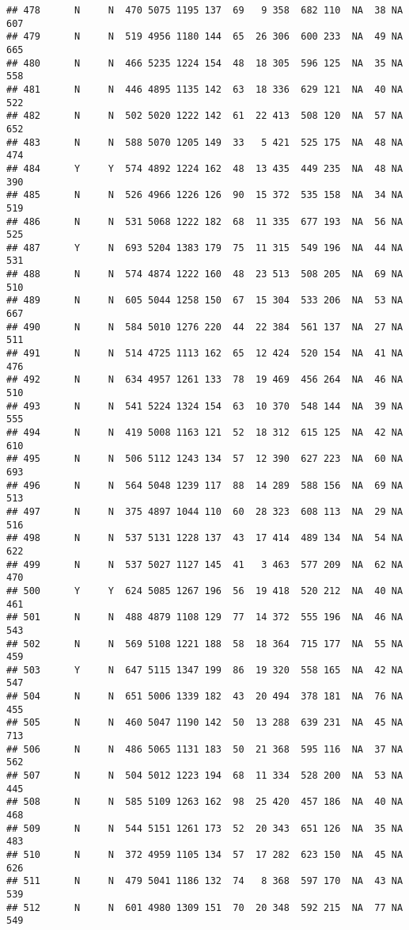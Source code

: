 \documentclass[]{article}
\begin{document}
\begin{verbatim}
## 478      N     N  470 5075 1195 137  69   9 358  682 110  NA  38 NA  607
## 479      N     N  519 4956 1180 144  65  26 306  600 233  NA  49 NA  665
## 480      N     N  466 5235 1224 154  48  18 305  596 125  NA  35 NA  558
## 481      N     N  446 4895 1135 142  63  18 336  629 121  NA  40 NA  522
## 482      N     N  502 5020 1222 142  61  22 413  508 120  NA  57 NA  652
## 483      N     N  588 5070 1205 149  33   5 421  525 175  NA  48 NA  474
## 484      Y     Y  574 4892 1224 162  48  13 435  449 235  NA  48 NA  390
## 485      N     N  526 4966 1226 126  90  15 372  535 158  NA  34 NA  519
## 486      N     N  531 5068 1222 182  68  11 335  677 193  NA  56 NA  525
## 487      Y     N  693 5204 1383 179  75  11 315  549 196  NA  44 NA  531
## 488      N     N  574 4874 1222 160  48  23 513  508 205  NA  69 NA  510
## 489      N     N  605 5044 1258 150  67  15 304  533 206  NA  53 NA  667
## 490      N     N  584 5010 1276 220  44  22 384  561 137  NA  27 NA  511
## 491      N     N  514 4725 1113 162  65  12 424  520 154  NA  41 NA  476
## 492      N     N  634 4957 1261 133  78  19 469  456 264  NA  46 NA  510
## 493      N     N  541 5224 1324 154  63  10 370  548 144  NA  39 NA  555
## 494      N     N  419 5008 1163 121  52  18 312  615 125  NA  42 NA  610
## 495      N     N  506 5112 1243 134  57  12 390  627 223  NA  60 NA  693
## 496      N     N  564 5048 1239 117  88  14 289  588 156  NA  69 NA  513
## 497      N     N  375 4897 1044 110  60  28 323  608 113  NA  29 NA  516
## 498      N     N  537 5131 1228 137  43  17 414  489 134  NA  54 NA  622
## 499      N     N  537 5027 1127 145  41   3 463  577 209  NA  62 NA  470
## 500      Y     Y  624 5085 1267 196  56  19 418  520 212  NA  40 NA  461
## 501      N     N  488 4879 1108 129  77  14 372  555 196  NA  46 NA  543
## 502      N     N  569 5108 1221 188  58  18 364  715 177  NA  55 NA  459
## 503      Y     N  647 5115 1347 199  86  19 320  558 165  NA  42 NA  547
## 504      N     N  651 5006 1339 182  43  20 494  378 181  NA  76 NA  455
## 505      N     N  460 5047 1190 142  50  13 288  639 231  NA  45 NA  713
## 506      N     N  486 5065 1131 183  50  21 368  595 116  NA  37 NA  562
## 507      N     N  504 5012 1223 194  68  11 334  528 200  NA  53 NA  445
## 508      N     N  585 5109 1263 162  98  25 420  457 186  NA  40 NA  468
## 509      N     N  544 5151 1261 173  52  20 343  651 126  NA  35 NA  483
## 510      N     N  372 4959 1105 134  57  17 282  623 150  NA  45 NA  626
## 511      N     N  479 5041 1186 132  74   8 368  597 170  NA  43 NA  539
## 512      N     N  601 4980 1309 151  70  20 348  592 215  NA  77 NA  549

\end{verbatim}
\end{document}

